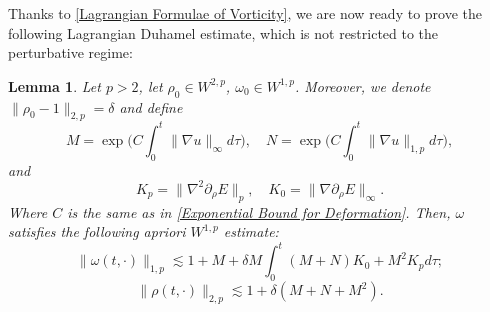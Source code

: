 \documentclass[12pt,letterpaper]{article}
\newtheorem{lem}[thm]{Lemma}
\theoremstyle{plain}
\begin{document}
Thanks to \eqref{Lagrangian Formulae of Vorticity}, we are now ready to prove the following Lagrangian Duhamel estimate, which is not restricted to the perturbative regime:
\begin{lem}\label{W1p Estimate for Vorticity}
 Let $p>2$, let $\rho_0\in W^{2,p}$, $\omega_0\in W^{1,p}$. Moreover, we denote $\lVert \rho_0-1\rVert_{2,p}=\delta$ and define
\begin{equation}\label{Streching Variable Definition}
M=\exp\bigg(C\int_0^t \lVert\nabla u\rVert_\infty d\tau\bigg),\quad N= \exp\bigg(C\int_0^t \lVert\nabla u\rVert_{1,p} d\tau\bigg),
\end{equation}
and
\begin{equation*}
K_p=\lVert\nabla^2\partial_\rho E\rVert_{p},\quad K_0=\lVert\nabla\partial_\rho E\rVert_\infty .    
\end{equation*}
Where $C$ is the same as in \eqref{Exponential Bound for Deformation}. Then, $\omega$ satisfies the following apriori $W^{1,p}$ estimate:
 \begin{equation}\label{1,p regularity of omega}
 \lVert\omega(t,\cdot)\rVert_{{1,p}}\lesssim 1+M+\delta M\int_0^t (M+N)K_0+M^2K_p d\tau    ;
 \end{equation}
  \begin{equation}\label{2,p regularity of rho}
 \lVert\rho(t,\cdot)\rVert_{{2,p}}\lesssim 1+\delta(M+N+M^2) .
 \end{equation}
\end{lem}
\end{document}
